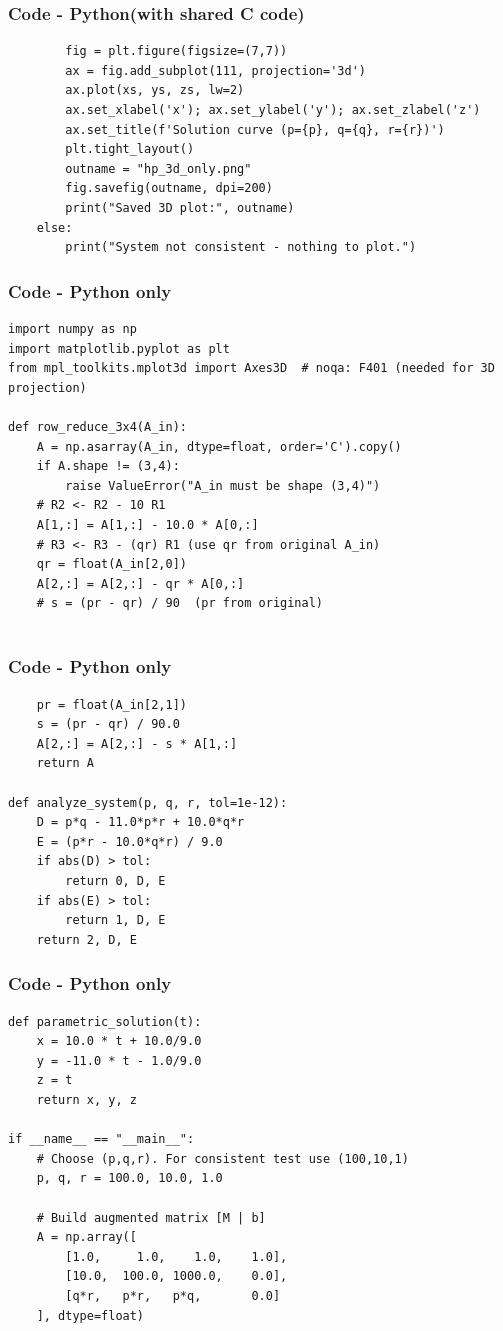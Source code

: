 \documentclass{beamer}
\theoremstyle{remark}
\numberwithin{equation}{section}
\begin{document}
\begin{frame}[fragile]
\frametitle{Code - Python(with shared C code)}
\begin{lstlisting}
        fig = plt.figure(figsize=(7,7))
        ax = fig.add_subplot(111, projection='3d')
        ax.plot(xs, ys, zs, lw=2)
        ax.set_xlabel('x'); ax.set_ylabel('y'); ax.set_zlabel('z')
        ax.set_title(f'Solution curve (p={p}, q={q}, r={r})')
        plt.tight_layout()
        outname = "hp_3d_only.png"
        fig.savefig(outname, dpi=200)
        print("Saved 3D plot:", outname)
    else:
        print("System not consistent - nothing to plot.")

\end{lstlisting}
\end{frame}




\begin{frame}[fragile]
\frametitle{Code - Python only}
\begin{lstlisting}
import numpy as np
import matplotlib.pyplot as plt
from mpl_toolkits.mplot3d import Axes3D  # noqa: F401 (needed for 3D projection)

def row_reduce_3x4(A_in):
    A = np.asarray(A_in, dtype=float, order='C').copy()
    if A.shape != (3,4):
        raise ValueError("A_in must be shape (3,4)")
    # R2 <- R2 - 10 R1
    A[1,:] = A[1,:] - 10.0 * A[0,:]
    # R3 <- R3 - (qr) R1 (use qr from original A_in)
    qr = float(A_in[2,0])
    A[2,:] = A[2,:] - qr * A[0,:]
    # s = (pr - qr) / 90  (pr from original)


\end{lstlisting}
\end{frame}
\begin{frame}[fragile]
\frametitle{Code - Python only}
\begin{lstlisting}
    pr = float(A_in[2,1])
    s = (pr - qr) / 90.0
    A[2,:] = A[2,:] - s * A[1,:]
    return A

def analyze_system(p, q, r, tol=1e-12):
    D = p*q - 11.0*p*r + 10.0*q*r
    E = (p*r - 10.0*q*r) / 9.0
    if abs(D) > tol:
        return 0, D, E
    if abs(E) > tol:
        return 1, D, E
    return 2, D, E
\end{lstlisting}
\end{frame}

\begin{frame}[fragile]
\frametitle{Code - Python only}
\begin{lstlisting}
def parametric_solution(t):
    x = 10.0 * t + 10.0/9.0
    y = -11.0 * t - 1.0/9.0
    z = t
    return x, y, z

if __name__ == "__main__":
    # Choose (p,q,r). For consistent test use (100,10,1)
    p, q, r = 100.0, 10.0, 1.0

    # Build augmented matrix [M | b]
    A = np.array([
        [1.0,     1.0,    1.0,    1.0],
        [10.0,  100.0, 1000.0,    0.0],
        [q*r,   p*r,   p*q,       0.0]
    ], dtype=float)

\end{lstlisting}
\end{frame}
\end{document}
